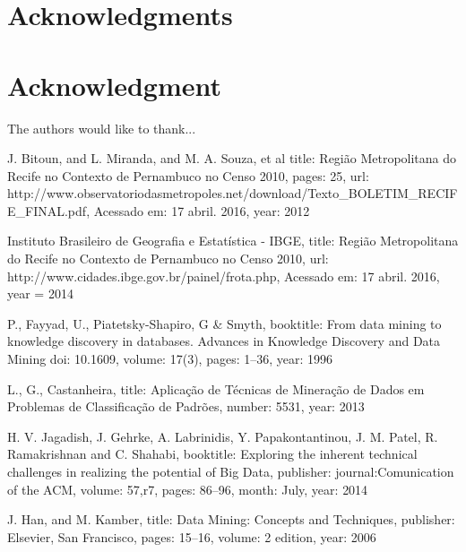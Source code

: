 \documentclass[conference,compsoc]{IEEEtran}
\begin{document}



\ifCLASSOPTIONcompsoc
  \section*{Acknowledgments}
\else
  \section*{Acknowledgment}
\fi


The authors would like to thank...




\begin{thebibliography}{1}

  J. Bitoun, and L. Miranda, and M. A. Souza, et al
  title: {Regi\~{a}o Metropolitana do Recife no Contexto de Pernambuco no Censo 2010},
  pages: {25},
  url:   {http://www.observatoriodasmetropoles.net/download/Texto\_BOLETIM\_RECIFE\_FINAL.pdf},
  Acessado em: {17 abril. 2016},
  year:  {2012}

  Instituto Brasileiro de Geografia e Estatística - IBGE,
  title: {Região Metropolitana do Recife no Contexto de Pernambuco no Censo 2010},
  url:  {http://www.cidades.ibge.gov.br/painel/frota.php},
  Acessado em: {17 abril. 2016},
  year = {2014}



  P., Fayyad, U., Piatetsky-Shapiro, G \& Smyth,
  booktitle: {From data mining to knowledge discovery in databases. Advances in Knowledge Discovery and Data Mining}
  doi: {10.1609},
  volume: {17(3)},
  pages: {1–36},
  year: {1996}

  L., G., Castanheira,
  title: {Aplicação de Técnicas de Mineração de Dados em Problemas de Classificação de Padrões},
  number: {5531},
  year: {2013}
  
  
  H. V. Jagadish, J. Gehrke, A. Labrinidis, Y. Papakontantinou, J. M. Patel, R. Ramakrishnan and C. Shahabi,
  booktitle: {Exploring the inherent technical challenges in realizing the potential of Big Data},
  publisher: {journal:Comunication of the ACM}, 
  volume: {57,r7}, 
  pages: {86--96}, 
  month: {July}, 
  year: {2014}

  J. Han, and M. Kamber,
  title: {Data Mining: Concepts and Techniques},
  publisher: {Elsevier, San Francisco},
  pages: {15--16},
  volume: {2 edition},
  year: {2006}



\end{thebibliography}
\end{document}
